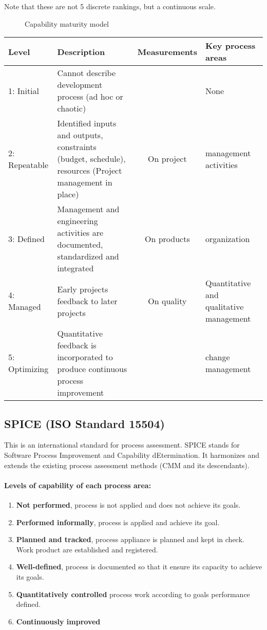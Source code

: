 Note that these are not 5 discrete rankings, but a
continuous scale.

\begin{figure}[!ht]
    \centering
    \begin{scriptsize}
        
    \end{scriptsize}
    \caption{Capability maturity model}
\end{figure}

\begin{tabular}{l|m{}cm{}}
    \bf Level & \bf Description & \bf Measurements & \bf Key process areas \\
    \hline
    1: Initial & Cannot describe development process (ad hoc or chaotic) && None \\
    2: Repeatable & Identified inputs and outputs, constraints (budget, schedule), resources
    (Project management in place) & On project & management activities\\
    3: Defined & Management and engineering activities are documented,
    standardized and integrated & On products & organization\\
    4: Managed & Early projects feedback to later projects & On quality
    & Quantitative and qualitative management \\
    5: Optimizing & Quantitative feedback is incorporated to produce
    continuous process improvement && change management\\
\end{tabular}

\subsection{SPICE (ISO Standard 15504)}

This is an international standard for process assessment. SPICE stands for
Software Process Improvement and Capability dEtermination. It harmonizes
and extends the existing process assessment methods (CMM and its
descendants).

\paragraph{Levels of capability of each process area:}
\begin{enumerate}
    \item \textbf{Not performed}, process is not applied
     and does not achieve its goals.
    \item \textbf{Performed informally}, process is applied and achieve its
    goal.
    \item \textbf{Planned and tracked}, process appliance is planned and
    kept in check. Work product are established and registered.
    \item \textbf{Well-defined}, process is documented so that it ensure its
    capacity to achieve its goals.
    \item \textbf{Quantitatively controlled} process work according to
    goals performance defined.
    \item \textbf{Continuously improved}
\end{enumerate}

